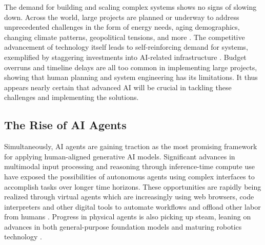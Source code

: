The demand for building and scaling complex systems shows no signs of slowing down. Across the world, large projects are planned or underway to address unprecedented challenges in the form of energy needs, aging demographics, changing climate patterns, geopolitical tensions, and more \cite{mckinsey2022, deloitte2023, reshoring2023}. The competitive advancement of technology itself leads to self-reinforcing demand for systems, exemplified by staggering investments into AI-related infrastructure \cite{uscongress2022, stargate2025}. Budget overruns and timeline delays are all too common in implementing large projects, showing that human planning and system engineering has its limitations. It thus appears nearly certain that advanced AI will be crucial in tackling these challenges and implementing the solutions.

\subsection{The Rise of AI Agents}

Simultaneously, AI agents are gaining traction as the most promising framework for applying human-aligned generative AI models. Significant advances in multimodal input processing and reasoning through inference-time compute use have exposed the possibilities of autonomous agents using complex interfaces to accomplish tasks over longer time horizons. These opportunities are rapidly being realized through virtual agents which are increasingly using web browsers, code interpreters and other digital tools to automate workflows and offload other labor from humans \cite{devin2024, openai2025operator}. Progress in physical agents is also picking up steam, leaning on advances in both general-purpose foundation models and maturing robotics technology \cite{nvidia2024gr00t, musk2024optimus}. 

